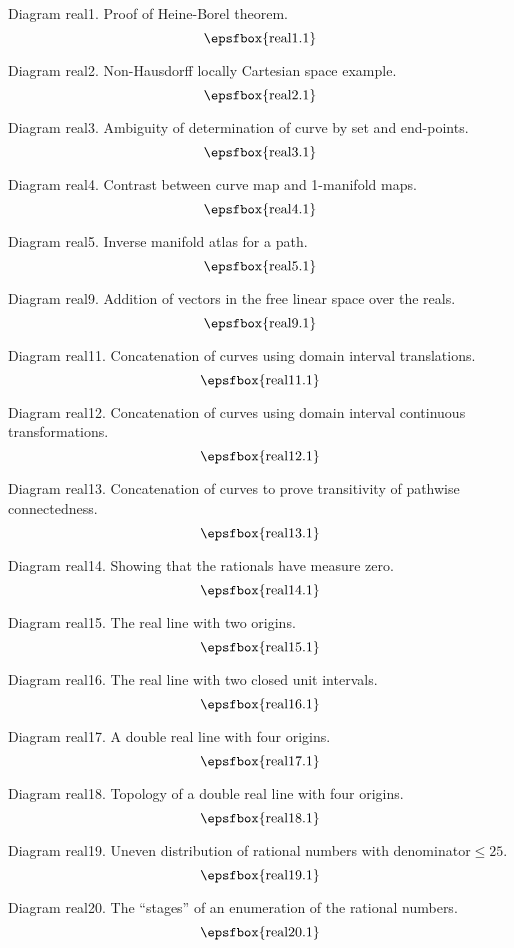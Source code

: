 Diagram real1. Proof of Heine-Borel theorem.
$$
\centerline{\epsfbox{real1.1}}
$$

Diagram real2. Non-Hausdorff locally Cartesian space example.
$$
\centerline{\epsfbox{real2.1}}
$$

Diagram real3. Ambiguity of determination of curve by set and end-points.
$$
\centerline{\epsfbox{real3.1}}
$$

Diagram real4. Contrast between curve map and 1-manifold maps.
$$
\centerline{\epsfbox{real4.1}}
$$

\filleject

Diagram real5. Inverse manifold atlas for a path.
$$
\centerline{\epsfbox{real5.1}}
$$

Diagram real9. Addition of vectors in the free linear space over the reals.
$$
\centerline{\epsfbox{real9.1}}
$$

Diagram real11. Concatenation of curves using domain interval translations.
$$
\centerline{\epsfbox{real11.1}}
$$

\filleject

Diagram real12. Concatenation of curves using domain interval continuous
transformations.
$$
\centerline{\epsfbox{real12.1}}
$$

Diagram real13. Concatenation of curves to prove transitivity of pathwise
connectedness.
$$
\centerline{\epsfbox{real13.1}}
$$

Diagram real14. Showing that the rationals have measure zero.
$$
\centerline{\epsfbox{real14.1}}
$$

Diagram real15. The real line with two origins.
$$
\centerline{\epsfbox{real15.1}}
$$

\filleject

Diagram real16. The real line with two closed unit intervals.
$$
\centerline{\epsfbox{real16.1}}
$$

Diagram real17. A double real line with four origins.
$$
\centerline{\epsfbox{real17.1}}
$$

Diagram real18. Topology of a double real line with four origins.
$$
\centerline{\epsfbox{real18.1}}
$$

Diagram real19. Uneven distribution of rational numbers with
denominator${}\le25$.
$$
\centerline{\epsfbox{real19.1}}
$$

Diagram real20. The ``stages'' of an enumeration of the rational numbers.
$$
\centerline{\epsfbox{real20.1}}
$$

